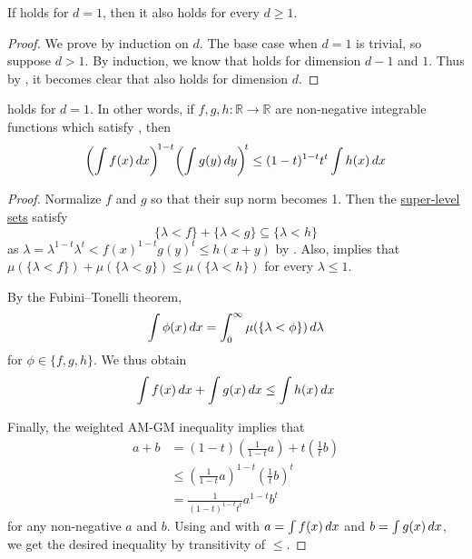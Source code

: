 \begin{corollary}
    If  holds for $d=1$, then it also holds for every $d\geq 1$.
\end{corollary}
\begin{proof}
    We prove by induction on $d$.
    The base case when $d=1$ is trivial, so suppose $d>1$.
    By induction, we know that  holds for dimension $d-1$ and $1$.
    Thus by , it becomes clear that  also holds for dimension $d$.
\end{proof}

\begin{lemma}
     holds for $d=1$. In other words,
    if $f,g,h:\mathbb{R}\to\mathbb{R}$ are non-negative integrable functions which satisfy ,
    then
    \[\biggl( \int f(x) \mathop{d\!} x \biggr)^{\!1-t} \biggl( \int g(y) \mathop{d\!} y \biggr)^{\!t} \le (1-t)^{1-t} t^{t} \int h(x) \mathop{d\!} x\]
\end{lemma}
\begin{proof}
    Normalize $f$ and $g$ so that their sup norm becomes 1.
    Then the \href{https://en.wikipedia.org/wiki/Level_set}{super-level sets} satisfy
    \[\{\lambda<f\}+\{\lambda<g\}\subseteq\{\lambda<h\}\]
    as $\lambda=\lambda^{1-t}\lambda^{t}<f(x)^{1-t}g(y)^{t}\leq h(x+y)$ by .
    Also,  implies that $\mu(\{\lambda<f\})+\mu(\{\lambda<g\})\leq\mu(\{\lambda<h\})$ for every $\lambda\leq 1$.

    By the Fubini--Tonelli theorem,
    \[\int\phi(x)\mathop{d\!} x=\int_{0}^{\infty}\mu(\{\lambda<\phi\})\mathop{d\!} \lambda\]
    for $\phi\in\{f,g,h\}$.
    We thus obtain
    \begin{equation}
        \label{claim:int-ineq}
        \int f(x)\mathop{d\!} x+\int g(x)\mathop{d\!} x\leq \int h(x)\mathop{d\!} x
    \end{equation}

    Finally, the weighted AM-GM inequality implies that
    \begin{equation}
        \label{claim:am-gm-coro}
        \begin{split}
            a+b
            &=(1-t)\left(\frac{1}{1-t}a\right)+t\left(\frac{1}{t}b\right)\\
            &\leq\left(\frac{1}{1-t}a\right)^{1-t}\left(\frac{1}{t}b\right)^{t}\\
            &=\frac{1}{(1-t)^{1-t}t^{t}}a^{1-t}b^{t}
        \end{split}
    \end{equation}
    for any non-negative $a$ and $b$.
    Using  and  with $a=\int f(x)\mathop{d\!} x$ and $b=\int g(x)\mathop{d\!} x$, we get the desired inequality by transitivity of $\leq$.
\end{proof}
